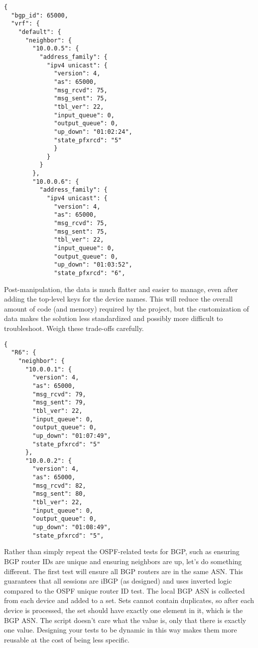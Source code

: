 \begin{verbatim}
{
  "bgp_id": 65000,
  "vrf": {
    "default": {
      "neighbor": {
        "10.0.0.5": {
          "address_family": {
            "ipv4 unicast": {
              "version": 4,
              "as": 65000,
              "msg_rcvd": 75,
              "msg_sent": 75,
              "tbl_ver": 22,
              "input_queue": 0,
              "output_queue": 0,
              "up_down": "01:02:24",
              "state_pfxrcd": "5"
              }
            }
          }
        },
        "10.0.0.6": {
          "address_family": {
            "ipv4 unicast": {
              "version": 4,
              "as": 65000,
              "msg_rcvd": 75,
              "msg_sent": 75,
              "tbl_ver": 22,
              "input_queue": 0,
              "output_queue": 0,
              "up_down": "01:03:52",
              "state_pfxrcd": "6",
\end{verbatim}

Post-manipulation, the data is much flatter and easier to manage, even after
adding the top-level keys for the device names. This will reduce
the overall amount of code (and memory) required by the project, but the
customization of data makes the solution less standardized and possibly
more difficult to troubleshoot. Weigh these trade-offs carefully.

\begin{verbatim}
{
  "R6": {
    "neighbor": {
      "10.0.0.1": {
        "version": 4,
        "as": 65000,
        "msg_rcvd": 79,
        "msg_sent": 79,
        "tbl_ver": 22,
        "input_queue": 0,
        "output_queue": 0,
        "up_down": "01:07:49",
        "state_pfxrcd": "5"
      },
      "10.0.0.2": {
        "version": 4,
        "as": 65000,
        "msg_rcvd": 82,
        "msg_sent": 80,
        "tbl_ver": 22,
        "input_queue": 0,
        "output_queue": 0,
        "up_down": "01:08:49",
        "state_pfxrcd": "5",
\end{verbatim}

Rather than simply repeat the OSPF-related tests for BGP, such as ensuring
BGP router IDs are unique and ensuring neighbors are up, let's do something
different. The first test will ensure all BGP routers are in the same ASN\@.
This guarantees that all sessions are iBGP (as designed) and uses inverted logic
compared to the OSPF unique router ID test. The local BGP ASN is collected from
each device and added to a set. Sets cannot contain duplicates, so after each
device is processed, the set should have exactly one element in it, which is
the BGP ASN\@. The script doesn't care what the value is, only that there is
exactly one value. Designing your tests to be dynamic in this way makes them
more reusable at the cost of being less specific.

